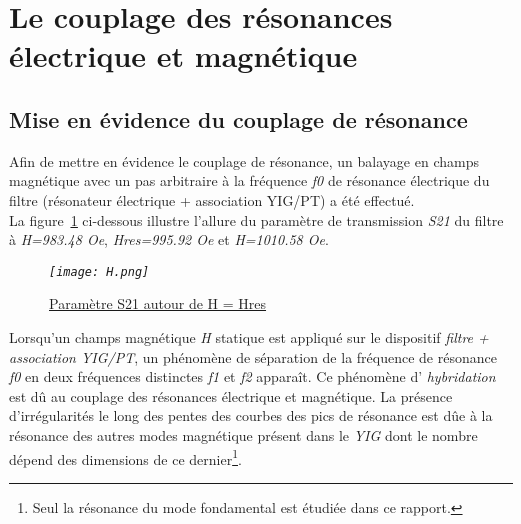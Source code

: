 \documentclass[12pt,fleqn]{book} %
\begin{document}
\section{Le couplage des résonances électrique et magnétique}
\subsection{Mise en évidence du couplage de résonance}
\noindent Afin de mettre en évidence le couplage de résonance, un balayage en champs magnétique avec un pas arbitraire à la fréquence \emph{f0} de résonance électrique du filtre (résonateur électrique + association YIG/PT) a été effectué.
~\\La figure~\underline{\color{blue}\ref{Hres}} ci-dessous illustre l'allure du paramètre de transmission \emph{S21} du filtre à \emph{H=983.48 Oe}, \emph{Hres=995.92 Oe} et \emph{H=1010.58 Oe}.
\begin{figure}[H]
	\centering
	\itshape
	\texttt{[image: H.png]}
	\caption{\label{Hres} \underline{Paramètre S21 autour de H = Hres}}
\end{figure}
\noindent Lorsqu'un champs magnétique \emph{H} statique est appliqué sur le dispositif \emph{filtre + association YIG/PT}, un phénomène de séparation de la fréquence de résonance \emph{f0} en deux fréquences distinctes \emph{f1} et \emph{f2} apparaît. Ce phénomène d' \emph{hybridation} est dû au couplage des résonances électrique et magnétique.
La présence d'irrégularités le long des pentes des courbes des pics de résonance est dûe à la résonance des autres modes magnétique présent dans le \emph{YIG} dont le nombre dépend des dimensions de ce dernier\footnote{Seul la résonance du mode fondamental est étudiée dans ce rapport.}. 
\end{document}

